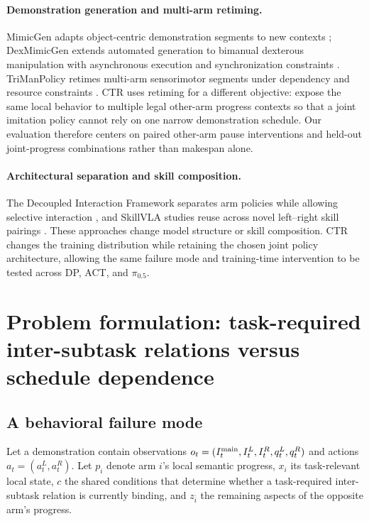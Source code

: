 \documentclass{article}
\newcommand{\method}{CTR}
\begin{document}
\paragraph{Demonstration generation and multi-arm retiming.}
MimicGen adapts object-centric demonstration segments to new contexts \citep{mandlekar2023mimicgen}; DexMimicGen extends automated generation to bimanual dexterous manipulation with asynchronous execution and synchronization constraints \citep{jiang2025dexmimicgen}. TriManPolicy retimes multi-arm sensorimotor segments under dependency and resource constraints \citep{zhao2026triman}. \method{} uses retiming for a different objective: expose the same local behavior to multiple legal other-arm progress contexts so that a joint imitation policy cannot rely on one narrow demonstration schedule. Our evaluation therefore centers on paired other-arm pause interventions and held-out joint-progress combinations rather than makespan alone.

\paragraph{Architectural separation and skill composition.}
The Decoupled Interaction Framework separates arm policies while allowing selective interaction \citep{jiang2025dif}, and SkillVLA studies reuse across novel left--right skill pairings \citep{zhai2026skillvla}. These approaches change model structure or skill composition. \method{} changes the training distribution while retaining the chosen joint policy architecture, allowing the same failure mode and training-time intervention to be tested across DP, ACT, and $\pi_{0.5}$.

\section{Problem formulation: task-required inter-subtask relations versus schedule dependence}
\subsection{A behavioral failure mode}
Let a demonstration contain observations $o_t=(I_t^{\rm main},I_t^L,I_t^R,q_t^L,q_t^R)$ and actions $a_t=(a_t^L,a_t^R)$. Let $p_i$ denote arm $i$'s local semantic progress, $x_i$ its task-relevant local state, $c$ the shared conditions that determine whether a task-required inter-subtask relation is currently binding, and $z_{\bar i}$ the remaining aspects of the opposite arm's progress.
\end{document}
